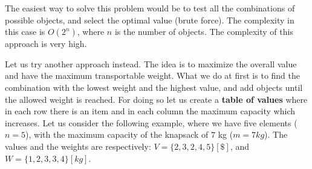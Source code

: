 The easiest way to solve this problem would be to test all the combinations of possible objects, and select the optimal value (brute force). The complexity in this case is \(O(2^{n})\), where \(n\) is the number of objects. The complexity of this approach is very high.

Let us try another approach instead. The idea is to maximize the overall value and have the maximum transportable weight. What we do at first is to find the combination with the lowest weight and the highest value, and add objects until the allowed weight is reached. For doing so let us create a \textbf{table of values} where in each row there is an item and in each column the maximum capacity which increases. Let us consider the following example, where we have five elements (\(n=5\)), with the maximum capacity of the knapsack of \(7\) kg (\(m=7kg\)). The values and the weights are respectively: \(V= \lbrace 2, 3, 2, 4, 5 \rbrace[\$]\), and \(W= \lbrace 1, 2, 3, 3, 4 \rbrace [kg]\).


